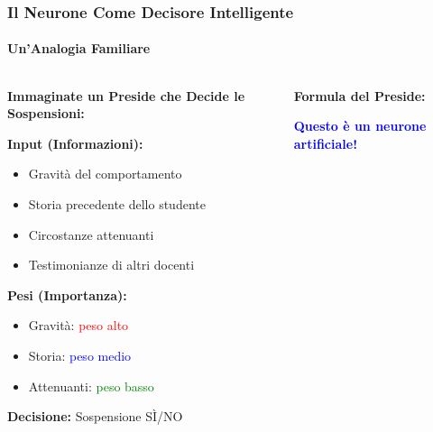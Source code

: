 \documentclass[aspectratio=169]{beamer}
\begin{document}
%
%
\begin{frame}
\frametitle{Il Neurone Come Decisore Intelligente}
\framesubtitle{Un'Analogia Familiare}

\begin{columns}
\begin{column}{0.6\textwidth}
\textbf{Immaginate un Preside che Decide le Sospensioni:}

\vspace{0.3cm}
\textbf{Input (Informazioni):}
\begin{itemize}
    \item Gravità del comportamento
    \item Storia precedente dello studente  
    \item Circostanze attenuanti
    \item Testimonianze di altri docenti
\end{itemize}

\vspace{0.3cm}
\textbf{Pesi (Importanza):}
\begin{itemize}
    \item Gravità: \textcolor{red}{peso alto}
    \item Storia: \textcolor{blue}{peso medio}
    \item Attenuanti: \textcolor{green}{peso basso}
\end{itemize}

\vspace{0.3cm}
\textbf{Decisione:} Sospensione SÌ/NO
\end{column}

\begin{column}{0.4\textwidth}
\begin{center}
\textbf{Formula del Preside:}

\vspace{0.3cm}

\vspace{0.5cm}
\textcolor{blue}{\textbf{Questo è un neurone artificiale!}}
\end{center}
\end{column}
\end{columns}

\end{frame}
\end{document}
